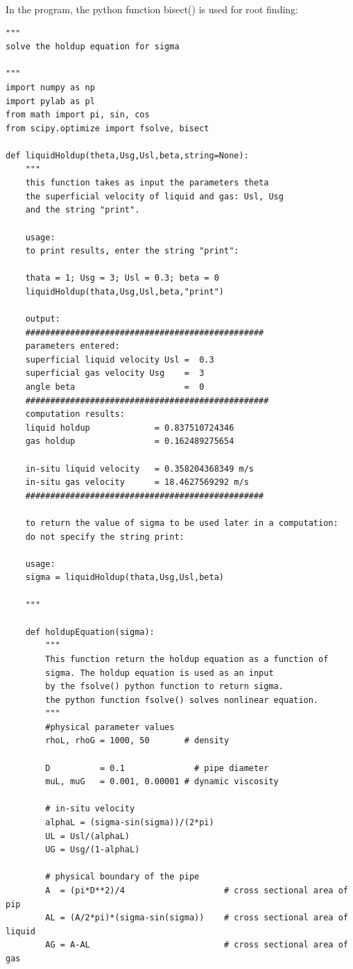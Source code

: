 \documentclass[10pt,a4paper]{report}
\begin{document}
In the program, the python function bisect() is used for root finding:
\begin{lstlisting}
"""
solve the holdup equation for sigma

"""
import numpy as np
import pylab as pl
from math import pi, sin, cos
from scipy.optimize import fsolve, bisect

def liquidHoldup(theta,Usg,Usl,beta,string=None):
    """
    this function takes as input the parameters theta 
    the superficial velocity of liquid and gas: Usl, Usg 
    and the string "print".
    
    usage: 
    to print results, enter the string "print":
    
    thata = 1; Usg = 3; Usl = 0.3; beta = 0
    liquidHoldup(thata,Usg,Usl,beta,"print")
    
    output:
    ################################################
    parameters entered:
    superficial liquid velocity Usl =  0.3
    superficial gas velocity Usg    =  3
    angle beta                      =  0
    #################################################
    computation results:
    liquid holdup             = 0.837510724346
    gas holdup                = 0.162489275654
    
    in-situ liquid velocity   = 0.358204368349 m/s
    in-situ gas velocity      = 18.4627569292 m/s
    ################################################
    
    to return the value of sigma to be used later in a computation:
    do not specify the string print:
    
    usage:
    sigma = liquidHoldup(thata,Usg,Usl,beta)

    """
    
    def holdupEquation(sigma):
        """
        This function return the holdup equation as a function of
        sigma. The holdup equation is used as an input
        by the fsolve() python function to return sigma.
        the python function fsolve() solves nonlinear equation.
        """
        #physical parameter values
        rhoL, rhoG = 1000, 50       # density

        D          = 0.1              # pipe diameter
        muL, muG   = 0.001, 0.00001 # dynamic viscosity
    
        # in-situ velocity
        alphaL = (sigma-sin(sigma))/(2*pi)
        UL = Usl/(alphaL)
        UG = Usg/(1-alphaL)
        
        # physical boundary of the pipe
        A  = (pi*D**2)/4                    # cross sectional area of pip
        AL = (A/2*pi)*(sigma-sin(sigma))    # cross sectional area of liquid
        AG = A-AL                           # cross sectional area of gas
        

\end{lstlisting}
\end{document}
